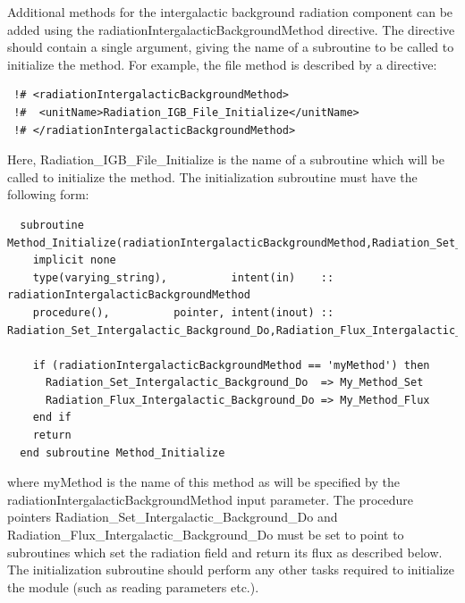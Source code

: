 Additional methods for the intergalactic background radiation component can be added using the {\normalfont \ttfamily radiationIntergalacticBackgroundMethod} directive. The directive should contain a single argument, giving the name of a subroutine to be called to initialize the method. For example, the {\normalfont \ttfamily file} method is described by a directive:
\begin{verbatim}
 !# <radiationIntergalacticBackgroundMethod>
 !#  <unitName>Radiation_IGB_File_Initialize</unitName>
 !# </radiationIntergalacticBackgroundMethod>
\end{verbatim}
Here, {\normalfont \ttfamily Radiation\_IGB\_File\_Initialize} is the name of a subroutine which will be called to initialize the method. The initialization subroutine must have the following form:
\begin{verbatim}
  subroutine Method_Initialize(radiationIntergalacticBackgroundMethod,Radiation_Set_Intergalactic_Background_Do,Radiation_Flux_Intergalactic_Background_Do)
    implicit none
    type(varying_string),          intent(in)    :: radiationIntergalacticBackgroundMethod
    procedure(),          pointer, intent(inout) :: Radiation_Set_Intergalactic_Background_Do,Radiation_Flux_Intergalactic_Background_Do
    
    if (radiationIntergalacticBackgroundMethod == 'myMethod') then
      Radiation_Set_Intergalactic_Background_Do  => My_Method_Set
      Radiation_Flux_Intergalactic_Background_Do => My_Method_Flux
    end if
    return
  end subroutine Method_Initialize
\end{verbatim}
where {\normalfont \ttfamily myMethod} is the name of this method as will be specified by the {\normalfont \ttfamily radiationIntergalacticBackgroundMethod} input parameter. The procedure pointers {\normalfont \ttfamily Radiation\_Set\_Intergalactic\_Background\_Do} and {\normalfont \ttfamily Radiation\_Flux\_Intergalactic\_Background\_Do} must be set to point to subroutines which set the radiation field and return its flux as described below. The initialization subroutine should perform any other tasks required to initialize the module (such as reading parameters etc.).


